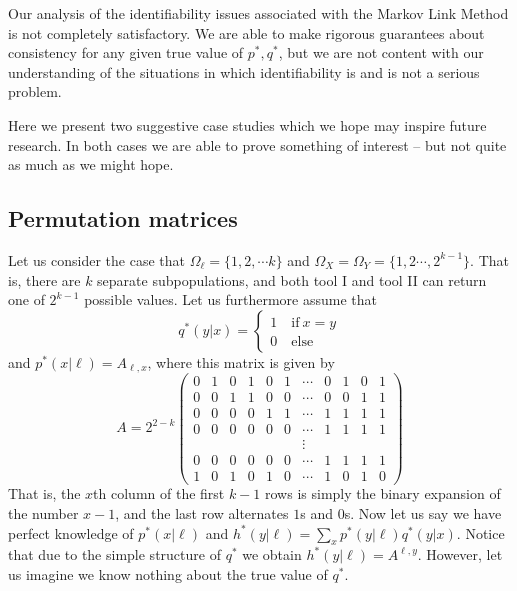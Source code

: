 Our analysis of the identifiability issues associated with the Markov Link Method is not completely satisfactory.  We are able to make rigorous guarantees about consistency for any given true value of $p^*,q^*$, but we are not content with our understanding of the situations in which identifiability is and is not a serious problem.  

Here we present two suggestive case studies which we hope may inspire future research.  In both cases we are able to prove something of interest -- but not quite as much as we might hope.  

\subsection{Permutation matrices}

Let us consider the case that $\Omega_\ell = \{1,2,\cdots k\}$ and $\Omega_X=\Omega_Y=\{1,2\cdots,2^{k-1}\}$.  That is, there are $k$ separate subpopulations, and both tool I and tool II can return one of $2^{k-1}$ possible values.  Let us furthermore assume that
\[
q^*(y|x)=\begin{cases}1 \quad \mathrm{if}\ x=y\\0\quad \mathrm{else}\end{cases}
\]
and  $p^*(x|\ell)=A_{\ell,x}$, where this matrix is given by
\[
A=2^{2-k}\left(\begin{array}{ccccccccccc}
0 & 1 & 0 & 1 & 0 & 1 & \cdots & 0 & 1 & 0 & 1\\
0 & 0 & 1 & 1 & 0 & 0 & \cdots & 0 & 0 & 1 & 1\\
0 & 0 & 0 & 0 & 1 & 1 & \cdots & 1 & 1 & 1 & 1\\
0 & 0 & 0 & 0 & 0 & 0 & \cdots & 1 & 1 & 1 & 1\\
 &  &  &  &  &  & \vdots\\
0 & 0 & 0 & 0 & 0 & 0 & \cdots & 1 & 1 & 1 & 1\\
1 & 0 & 1 & 0 & 1 & 0 & \cdots & 1 & 0 & 1 & 0
\end{array}\right)
\]
That is, the $x$th column of the first $k-1$ rows is simply the binary expansion of the number $x-1$, and the last row alternates $1$s and $0$s.  Now let us say we have perfect knowledge of $p^*(x|\ell)$ and $h^*(y|\ell)=\sum_x p^*(y|\ell)q^*(y|x)$.  Notice that due to the simple structure of $q^*$ we obtain $h^*(y|\ell)=A^{\ell,y}$.  However, let us imagine we know nothing about the true value of $q^*$.  

